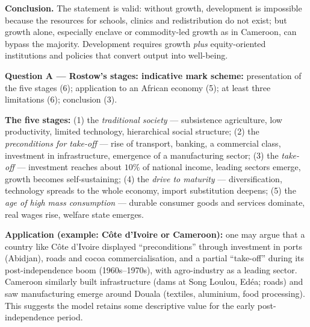 \documentclass[11pt]{article}
\begin{document}
\begin{corrige}
\textbf{Conclusion.} The statement is valid: without growth, development is impossible because the resources for schools, clinics and redistribution do not exist; but growth alone, especially enclave or commodity-led growth as in Cameroon, can bypass the majority. Development requires growth \emph{plus} equity-oriented institutions and policies that convert output into well-being.
\end{corrige}

\begin{corrige}
\textbf{Question A — Rostow's stages: indicative mark scheme:} presentation of the five stages (6); application to an African economy (5); at least three limitations (6); conclusion (3).

\textbf{The five stages:} (1) the \emph{traditional society} — subsistence agriculture, low productivity, limited technology, hierarchical social structure; (2) the \emph{preconditions for take-off} — rise of transport, banking, a commercial class, investment in infrastructure, emergence of a manufacturing sector; (3) the \emph{take-off} — investment reaches about $10\%$ of national income, leading sectors emerge, growth becomes self-sustaining; (4) the \emph{drive to maturity} — diversification, technology spreads to the whole economy, import substitution deepens; (5) the \emph{age of high mass consumption} — durable consumer goods and services dominate, real wages rise, welfare state emerges.

\textbf{Application (example: Côte d'Ivoire or Cameroon):} one may argue that a country like Côte d'Ivoire displayed ``preconditions'' through investment in ports (Abidjan), roads and cocoa commercialisation, and a partial ``take-off'' during its post-independence boom (1960s--1970s), with agro-industry as a leading sector. Cameroon similarly built infrastructure (dams at Song Loulou, Edéa; roads) and saw manufacturing emerge around Douala (textiles, aluminium, food processing). This suggests the model retains some descriptive value for the early post-independence period.


\end{corrige}
\end{document}
